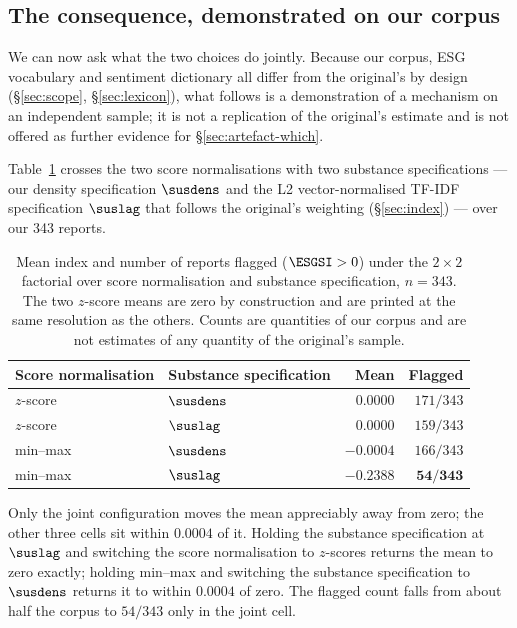 \subsection{The consequence, demonstrated on our corpus}
\label{sec:artefact-consequence}

We can now ask what the two choices do jointly. Because our corpus, ESG
vocabulary and sentiment dictionary all differ from the original's by design
(\S\ref{sec:scope}, \S\ref{sec:lexicon}), what follows is a demonstration of a
mechanism on an independent sample; it is not a replication of the original's
estimate and is not offered as further evidence for
\S\ref{sec:artefact-which}.

Table~\ref{tab:artefact-factorial} crosses the two score normalisations with
two substance specifications --- our density specification $\susdens$ and the
L2 vector-normalised TF-IDF specification $\suslag$ that follows the original's
weighting (\S\ref{sec:index}) --- over our 343 reports.

\begin{table}[htbp]
\centering
\caption{Mean index and number of reports flagged ($\ESGSI > 0$) under the
$2 \times 2$ factorial over score normalisation and substance specification,
$n = 343$. The two $z$-score means are zero by construction and are printed at
the same resolution as the others. Counts are quantities of our corpus and are
not estimates of any quantity of the original's sample.}
\label{tab:artefact-factorial}
\begin{tabular}{llrr}
\toprule
Score normalisation & Substance specification & Mean & Flagged \\
\midrule
$z$-score & $\susdens$ & $0.0000$ & $171/343$ \\
$z$-score & $\suslag$  & $0.0000$ & $159/343$ \\
min--max  & $\susdens$ & $-0.0004$ & $166/343$ \\
min--max  & $\suslag$  & $\mathbf{-0.2388}$ & $\mathbf{54/343}$ \\
\bottomrule
\end{tabular}
\end{table}

Only the joint configuration moves the mean appreciably away from zero; the
other three cells sit within $0.0004$ of it. Holding the substance
specification at $\suslag$ and switching the score normalisation to $z$-scores
returns the mean to zero exactly; holding min--max and switching the substance
specification to $\susdens$ returns it to within $0.0004$ of zero. The flagged
count falls from about half the corpus to $54/343$ only in the joint cell.

